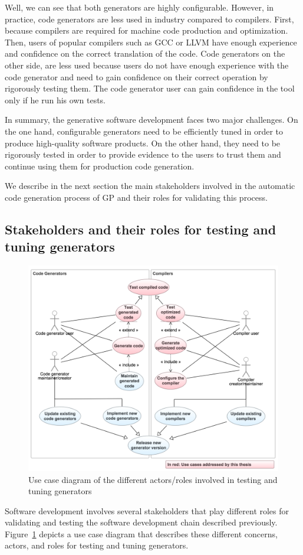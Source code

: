 Well, we can see that both generators are highly configurable. However, in practice, code generators are less used in industry compared to compilers. First, because compilers are required for machine code production and optimization. Then, users of popular compilers such as GCC or LLVM have enough experience and confidence on the correct translation of the code. 
Code generators on the other side, are less used because users do not have enough experience with the code generator and need to gain confidence on their correct operation by rigorously testing them. The code generator user can gain confidence in the tool only if he run his own tests.

In summary, the generative software development faces two major challenges. On the one hand, configurable generators need to be efficiently tuned in order to produce high-quality software products. On the other hand, they need to be rigorously tested in order to provide evidence to the users to trust them and continue using them for production code generation.

We describe in the next section the main stakeholders involved in the automatic code generation process of GP and their roles for validating this process.


\subsection{Stakeholders and their roles for testing and tuning generators}
\begin{figure}[h]
	\center
	\includegraphics[scale=0.6]{Background/fig/usecase}
	\caption{Use case diagram of the different actors/roles involved in testing and tuning generators}
	\label{fig:usecase}
\end{figure}
Software development involves several stakeholders that play different roles for validating and testing the software development chain described previously.
Figure~\ref{fig:usecase} depicts a use case diagram that describes these different concerns, actors, and roles for testing and tuning generators.

